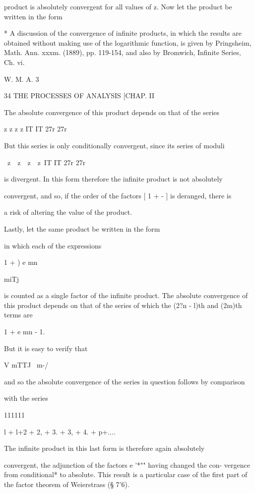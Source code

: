 product is absolutely convergent for all values of z. Now let the
product be written in the form

* A discussion of the convergence of infinite products, in which the
results are obtained without making use of the logarithmic function,
is given by Pringsheim, Math. Ann. xxxm. (1889), pp. 119-154, and also
by Bromwich, Infinite Series, Ch. vi.

W. M. A. 3



34 THE PROCESSES OF ANALYSIS [CHAP. II

The absolute convergence of this product depends on that of the series



z z z z IT IT 27r 27r



But this series is only conditionally convergent, since its series of
moduli

\ z\ \ z\ \ z\ \ z\ IT IT 27r 27r

is divergent. In this form therefore the infinite product is not
absolutely

convergent, and so, if the order of the factors [ 1 + - ] is deranged,
there is

a risk of altering the value of the product.

Lastly, let the same product be written in the form

in which each of the expressions



1 + ) e mn

miTj



is counted as a single factor of the infinite product. The absolute
convergence of this product depends on that of the series of which the
(2?n - l)th and (2m)th terms are

1 + e mn - 1.

But it is easy to verify that

V mTTJ \ m-/

and so the absolute convergence of the series in question follows by
comparison

with the series

111111

l + l+2 + 2, + 3. + 3, + 4. + p+....

The infinite product in this last form is therefore again absolutely

convergent, the adjunction of the factors e '*"" having changed the
con- vergence from conditional* to absolute. This result is a
particular case of the first part of the factor theorem of Weierstrass
(§ 7'6).

